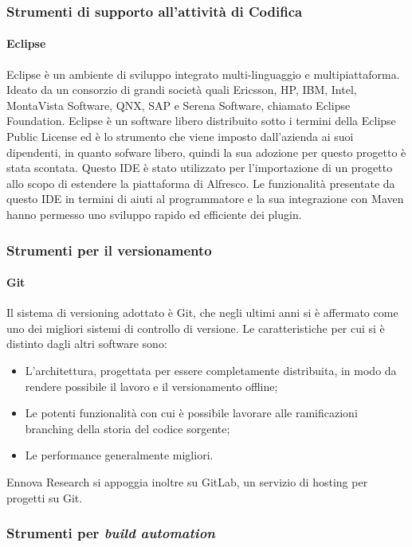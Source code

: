 \subsubsection{Strumenti di supporto all’attività di Codifica}
\paragraph{Eclipse}
Eclipse è un ambiente di sviluppo integrato multi-linguaggio e multipiattaforma. Ideato da un consorzio di grandi società quali Ericsson, HP, IBM, Intel, MontaVista Software, QNX, SAP e Serena Software, chiamato Eclipse Foundation.
Eclipse è un software libero distribuito sotto i termini della Eclipse Public License ed è lo strumento che viene imposto dall'azienda ai suoi dipendenti, in quanto sofware libero, quindi la sua adozione per questo progetto è stata scontata.
Questo IDE è stato utilizzato per l’importazione
di un progetto allo scopo di estendere la piattaforma di Alfresco. Le funzionalità
presentate da questo IDE in termini di aiuti al programmatore e la sua integrazione con Maven hanno permesso uno sviluppo rapido ed efficiente dei plugin.
\subsubsection{Strumenti per il versionamento}
\paragraph{Git}
Il sistema di versioning adottato è Git, che negli ultimi anni si è affermato come uno
dei migliori sistemi di controllo di versione.
Le caratteristiche per cui si è distinto dagli altri software sono:
\begin{itemize}
\item L’architettura, progettata per essere completamente distribuita, in modo da
rendere possibile il lavoro e il versionamento offline;
\item Le potenti funzionalità con cui è possibile lavorare alle ramificazioni branching
della storia del codice sorgente;
\item Le performance generalmente migliori.
\end{itemize}
Ennova Research si appoggia inoltre su GitLab, un servizio di hosting per progetti
su Git.
\subsubsection{Strumenti per \emph{build automation}}
